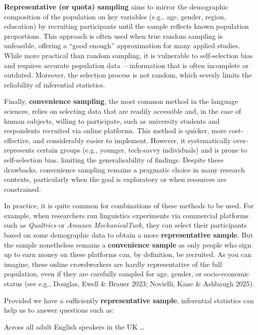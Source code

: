 \documentclass[
  letterpaper,
  DIV=11,
  numbers=noendperiod]{scrreprt}
\newcounter{none} %
\begin{document}
\begin{tcolorbox}
\textbf{Representative (or quota) sampling} aims to mirror the
demographic composition of the population on key variables (e.g., age,
gender, region, education) by recruiting participants until the sample
reflects known population proportions. This approach is often used when
true random sampling is unfeasible, offering a ``good enough''
approximation for many applied studies. While more practical than random
sampling, it is vulnerable to self-selection bias and requires accurate
population data ---information that is often incomplete or outdated.
Moreover, the selection process is not random, which severly limits the
reliability of inferential statistics.

Finally, \textbf{convenience sampling}, the most common method in the
language sciences, relies on selecting data that are readily accessible
and, in the case of human subjects, willing to participate, such as
university students and respondents recruited via online platforms. This
method is quicker, more cost-effective, and considerably easier to
implement. However, it systematically over-represents certain groups
(e.g., younger, tech-savvy individuals) and is prone to self-selection
bias, limiting the generalisability of findings. Despite these
drawbacks, convenience sampling remains a pragmatic choice in many
research contexts, particularly when the goal is exploratory or when
resources are constrained.

\end{tcolorbox}

In practice, it is quite common for combinations of these methods to be
used. For example, when researchers run linguistics experiments via
commercial platforms such as \emph{Qualtrics} or \emph{Amazon}
\emph{MechanicalTurk,} they can select their participants based on some
demographic data to obtain a more \textbf{representative sample}. But
the sample nonetheless remains a \textbf{convenience sample} as only
people who sign up to earn money on these platforms can, by definition,
be recruited. As you can imagine, these online crowdworkers are hardly
representative of the full population, even if they are carefully
sampled for age, gender, or socio-economic status (see e.g., Douglas,
Ewell \& Brauer 2023; Novielli, Kane \& Ashbaugh 2025).

Provided we have a sufficiently \textbf{representative sample},
inferential statistics can help us to answer questions such as:

Across all adult English speakers in the UK \ldots{}
\end{document}
